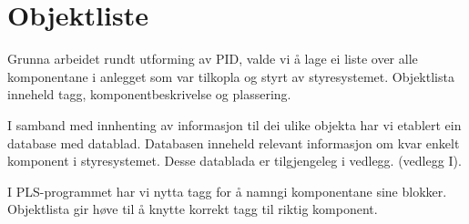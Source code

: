 \section{Objektliste}
\thispagestyle{fancy}

Grunna arbeidet rundt utforming av \gls{PID}, valde vi å lage ei liste over alle komponentane i anlegget som var tilkopla og styrt av styresystemet.
Objektlista inneheld tagg, komponentbeskrivelse og plassering. 

I samband med innhenting av informasjon til dei ulike objekta har vi etablert ein database med datablad.
Databasen inneheld relevant informasjon om kvar enkelt komponent i styresystemet.\newline
Desse datablada er tilgjengeleg i vedlegg. (vedlegg I). 

I \gls{PLS}-programmet har vi nytta tagg for å namngi komponentane sine blokker.\newline
Objektlista gir høve til å knytte korrekt tagg til riktig komponent.

\newpage

